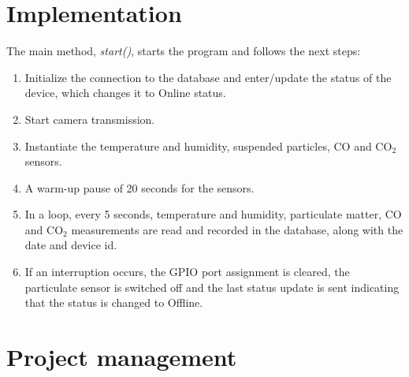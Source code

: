 \section{Implementation}\label{sec:implementation}
The main method, \textit{start()}, starts the program and follows the next steps:
\begin{enumerate}
	\item Initialize the connection to the database and enter/update the status of the device, which changes it to Online status.
	\item Start camera transmission.
	\item Instantiate the temperature and humidity, suspended particles, CO and CO$_2$ sensors.
	\item A warm-up pause of 20 seconds for the sensors.
	\item In a loop, every 5 seconds, temperature and humidity, particulate matter, CO and CO$_2$ measurements are read and recorded in the database, along with the date and device id.
	\item If an interruption occurs, the GPIO port assignment is cleared, the particulate sensor is switched off and the last status update is sent indicating that the status is changed to Offline.
\end{enumerate}

\section{Project management}\label{sec:project-management}

